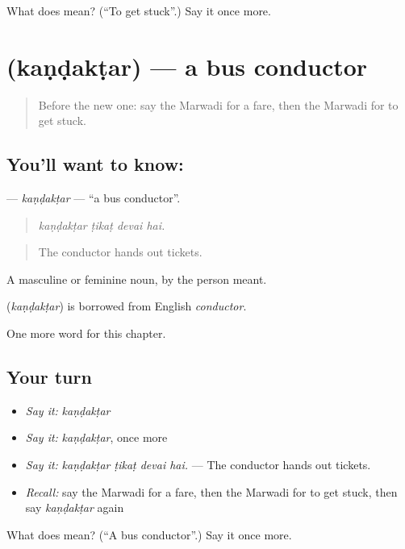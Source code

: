 \begin{tcolorbox}[breakable,colback=teal!4,colframe=teal!35!black,title={Before you move on}]
What does  mean? (\textquotedblleft{}To get stuck\textquotedblright{}.) Say it once more.
\end{tcolorbox}
\section[\texorpdfstring{\mw{कंडक्टर} (kaṇḍakṭar)}{कंडक्टर (kaṇḍakṭar)}]{ (kaṇḍakṭar) — a bus conductor}

\label{lesson:MW-C205-kandaktar}



\begin{quote}
Before the new one: say the Marwadi for a fare, then the Marwadi for to get stuck.
\end{quote}

\subsection*{You'll want to know: }
\textbf{} — \emph{kaṇḍakṭar} — \textquotedblleft{}a bus conductor\textquotedblright{}.

\begin{quote}
   
\end{quote}

\begin{quote}
\emph{kaṇḍakṭar ṭikaṭ devai hai.}
\end{quote}

\begin{quote}
The conductor hands out tickets.
\end{quote}

A masculine or feminine noun, by the person meant.

\begin{cousinweb}
\textbf{} (\emph{kaṇḍakṭar}) is borrowed from English \emph{conductor}.
\end{cousinweb}

\begin{grammarlens}[title={What you've built}]
One more word for this chapter.
\end{grammarlens}

\subsection*{Your turn}
\begin{itemize}
\raggedright
  \item \emph{Say it:} \emph{kaṇḍakṭar}
  \item \emph{Say it:} \emph{kaṇḍakṭar}, once more
  \item \emph{Say it:} \emph{kaṇḍakṭar ṭikaṭ devai hai.} — The conductor hands out tickets.
  \item \emph{Recall:} say the Marwadi for a fare, then the Marwadi for to get stuck, then say \emph{kaṇḍakṭar} again
\end{itemize}

\begin{tcolorbox}[breakable,colback=teal!4,colframe=teal!35!black,title={Before you move on}]
What does  mean? (\textquotedblleft{}A bus conductor\textquotedblright{}.) Say it once more.
\end{tcolorbox}
